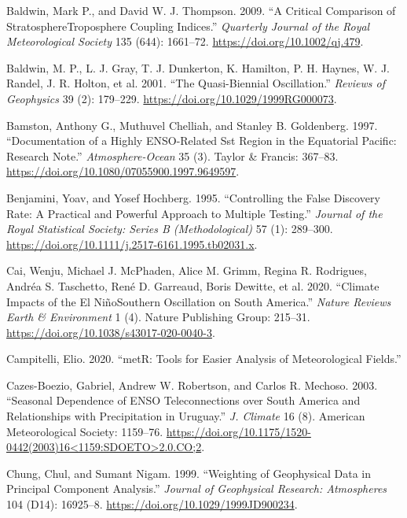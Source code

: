 \documentclass[smallextended]{svjour3}       %
\begin{document}
\leavevmode\hypertarget{ref-baldwin2009}{}%
Baldwin, Mark P., and David W. J. Thompson. 2009. ``A Critical Comparison of StratosphereTroposphere Coupling Indices.'' \emph{Quarterly Journal of the Royal Meteorological Society} 135 (644): 1661--72. \url{https://doi.org/10.1002/qj.479}.

\leavevmode\hypertarget{ref-baldwin2001b}{}%
Baldwin, M. P., L. J. Gray, T. J. Dunkerton, K. Hamilton, P. H. Haynes, W. J. Randel, J. R. Holton, et al. 2001. ``The Quasi-Biennial Oscillation.'' \emph{Reviews of Geophysics} 39 (2): 179--229. \url{https://doi.org/10.1029/1999RG000073}.

\leavevmode\hypertarget{ref-bamston1997}{}%
Bamston, Anthony G., Muthuvel Chelliah, and Stanley B. Goldenberg. 1997. ``Documentation of a Highly ENSO-Related Sst Region in the Equatorial Pacific: Research Note.'' \emph{Atmosphere-Ocean} 35 (3). Taylor \& Francis: 367--83. \url{https://doi.org/10.1080/07055900.1997.9649597}.

\leavevmode\hypertarget{ref-benjamini1995}{}%
Benjamini, Yoav, and Yosef Hochberg. 1995. ``Controlling the False Discovery Rate: A Practical and Powerful Approach to Multiple Testing.'' \emph{Journal of the Royal Statistical Society: Series B (Methodological)} 57 (1): 289--300. \url{https://doi.org/10.1111/j.2517-6161.1995.tb02031.x}.

\leavevmode\hypertarget{ref-cai2020a}{}%
Cai, Wenju, Michael J. McPhaden, Alice M. Grimm, Regina R. Rodrigues, Andréa S. Taschetto, René D. Garreaud, Boris Dewitte, et al. 2020. ``Climate Impacts of the El NiñoSouthern Oscillation on South America.'' \emph{Nature Reviews Earth \& Environment} 1 (4). Nature Publishing Group: 215--31. \url{https://doi.org/10.1038/s43017-020-0040-3}.

\leavevmode\hypertarget{ref-campitelli2020}{}%
Campitelli, Elio. 2020. ``metR: Tools for Easier Analysis of Meteorological Fields.''

\leavevmode\hypertarget{ref-cazes-boezio2003}{}%
Cazes-Boezio, Gabriel, Andrew W. Robertson, and Carlos R. Mechoso. 2003. ``Seasonal Dependence of ENSO Teleconnections over South America and Relationships with Precipitation in Uruguay.'' \emph{J. Climate} 16 (8). American Meteorological Society: 1159--76. \href{https://doi.org/10.1175/1520-0442(2003)16\%3C1159:SDOETO\%3E2.0.CO;2}{https://doi.org/10.1175/1520-0442(2003)16\textless{}1159:SDOETO\textgreater{}2.0.CO;2}.

\leavevmode\hypertarget{ref-chung1999}{}%
Chung, Chul, and Sumant Nigam. 1999. ``Weighting of Geophysical Data in Principal Component Analysis.'' \emph{Journal of Geophysical Research: Atmospheres} 104 (D14): 16925--8. \url{https://doi.org/10.1029/1999JD900234}.
\end{document}
